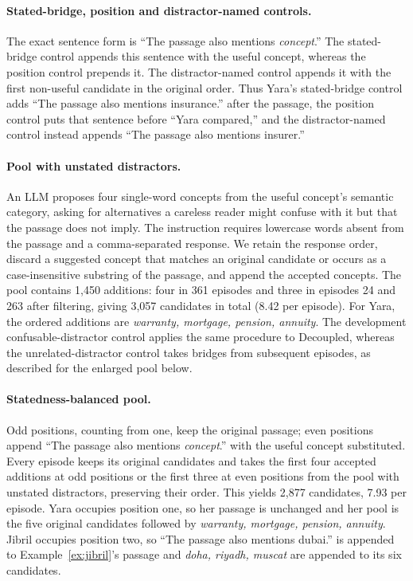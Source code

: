 \paragraph{Stated-bridge, position and distractor-named controls.}
The exact sentence form is ``The passage also mentions \emph{concept}.''
The stated-bridge control appends this sentence with the useful concept,
whereas the position control prepends it. The distractor-named control
appends it with the first non-useful candidate in the original order.
Thus Yara's stated-bridge control adds ``The passage also mentions
insurance.'' after the passage, the position control puts that sentence
before ``Yara compared,'' and the distractor-named control instead
appends ``The passage also mentions insurer.''

\paragraph{Pool with unstated distractors.}
An LLM proposes four single-word concepts from the useful concept's
semantic category, asking for alternatives a careless reader might
confuse with it but that the passage does not imply. The instruction
requires lowercase words absent from the passage and a comma-separated
response. We retain the response order, discard a suggested concept that
matches an original candidate or occurs as a case-insensitive substring
of the passage, and append the accepted concepts. The pool contains
1,450 additions: four in 361 episodes and three in episodes 24 and 263
after filtering, giving 3,057 candidates in total (8.42 per episode).
For Yara, the ordered additions are \emph{warranty, mortgage, pension,
annuity}. The development confusable-distractor control applies the same
procedure to Decoupled, whereas the unrelated-distractor control takes
bridges from subsequent episodes, as described for the enlarged pool
below.

\paragraph{Statedness-balanced pool.}
Odd positions, counting from one, keep the original passage; even
positions append ``The passage also mentions \emph{concept}.'' with
the useful concept substituted. Every episode keeps its original
candidates and takes the first four accepted additions at odd positions
or the first three at even positions from the pool with unstated
distractors, preserving their order. This yields 2,877 candidates,
7.93 per episode. Yara occupies position one, so her passage is unchanged
and her pool is the five original candidates followed by \emph{warranty,
mortgage, pension, annuity}. Jibril occupies position two, so ``The
passage also mentions dubai.'' is appended to
Example~\ref{ex:jibril}'s passage and \emph{doha, riyadh, muscat} are
appended to its six candidates.

